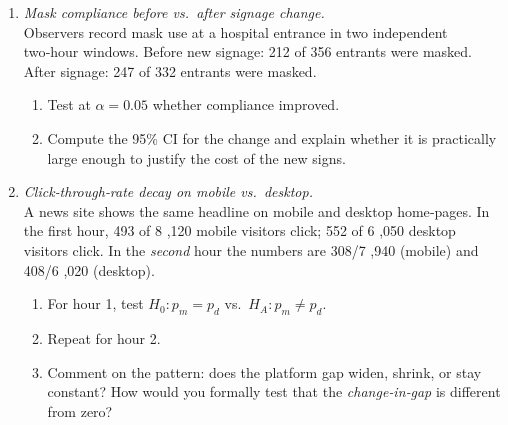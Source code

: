 \documentclass[11pt]{article}
\begin{document}
\begin{enumerate}[label=\textbf{Q\,\arabic*:}, start=16, left=0pt]
\item  \emph{Mask compliance before vs.\ after signage change.} \\
      Observers record mask use at a hospital entrance in two independent two‑hour windows.  
      Before new signage: 212 of 356 entrants were masked.  
      After signage: 247 of 332 entrants were masked.
      \begin{enumerate}[label=(\alph*)]
          \item Test at $\alpha=0.05$ whether compliance improved.  
          \item Compute the 95\% CI for the change and explain whether it is practically large enough to justify the cost of the new signs.  
      \end{enumerate}

\item  \emph{Click‑through‑rate decay on mobile vs.\ desktop.} \\
      A news site shows the same headline on mobile and desktop home‑pages.  
      In the first hour, 493 of 8 ,120 mobile visitors click; 552 of 6 ,050 desktop visitors click.  
      In the \emph{second} hour the numbers are 308/7 ,940 (mobile) and 408/6 ,020 (desktop).  
      \begin{enumerate}[label=(\alph*)]
          \item For hour 1, test $H_0{:}p_m=p_d$ vs.\ $H_A{:}p_m\neq p_d$.  
          \item Repeat for hour 2.  
          \item Comment on the pattern: does the platform gap widen, shrink, or stay constant?  
                How would you formally test that the \emph{change‑in‑gap} is different from zero?
      \end{enumerate}

\end{enumerate}
\end{document}
